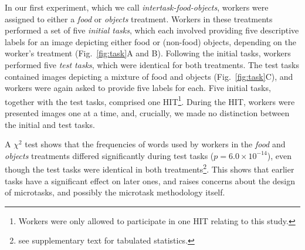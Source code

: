 \documentclass[12pt]{article}
\begin{document}
In our first experiment, which we call
\textit{intertask-food-objects}, workers were assigned to either a
\textit{food} or \textit{objects} treatment.  Workers in these treatments
performed a set of five \textit{initial tasks}, which each involved 
providing five descriptive labels for an image depicting 
either food or (non-food) objects, depending on the worker's 
treatment (Fig.~\ref{fig:task}A and B).  Following the initial 
tasks, workers performed five \textit{test tasks}, which were identical for 
both treatments.  The test tasks contained images depicting a 
mixture of food and objects (Fig.~\ref{fig:task}C), and workers
were again asked to provide five labels for each.  Five initial 
tasks, together with the test tasks, comprised one HIT\footnote{
	Workers were only allowed to participate in one HIT relating to this study.
}. During the HIT, workers 
were presented images one at a time, and, crucially, we made no 
distinction between the initial and test tasks.

A $\chi^2$ test shows that the frequencies of words used by
workers in the \textit{food} and \textit{objects} treatments differed
significantly during test tasks ($p = 6.0 \times 10^{-14}$), even though the test tasks were identical 
in both treatments\footnote{see supplementary text for tabulated statistics.}.  This shows that earlier tasks have a 
significant effect on later ones, and raises concerns about the 
design of microtasks, and possibly the microtask methodology itself.
\end{document}
